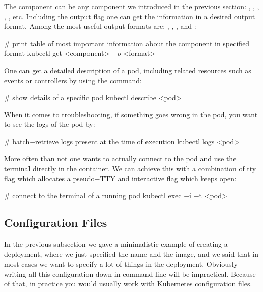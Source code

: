 The component can be any component we introduced in the previous section: , , ,
, , etc. Including the output flag  one can get the information in a
desired output format. Among the most useful output formats are: , , ,
 and :

\begin{bash}
# print table of most important information about the component in specified format
kubectl get <component> $-o$ <format>
\end{bash}

One can get a detailed description of a pod, including related resources such as events or controllers by using the
 command:

\begin{bash}
# show details of a specific pod
kubectl describe <pod>
\end{bash}

When it comes to troubleshooting, if something goes wrong in the pod, you want to see the logs of the pod by:

\begin{bash}
# batch$-$retrieve logs present at the time of execution
kubectl logs <pod>
\end{bash}

More often than not one wants to actually connect to the pod and use the terminal directly in the container. We can
achieve this with a combination of tty  flag which allocates a pseudo$-$TTY and interactive 
flag which keeps  open:

\begin{bash}
# connect to the terminal of a running pod
kubectl exec $-$i $-$t <pod>
\end{bash}

\subsection{Configuration Files}

In the previous subsection we gave a minimalistic example of creating a deployment, where we just specified the name
and the image, and we said that in most cases we want to specify a lot of things in the deployment. Obviously writing
all this configuration down in command line will be impractical. Because of that, in practice you would usually work
with Kubernetes configuration files.

